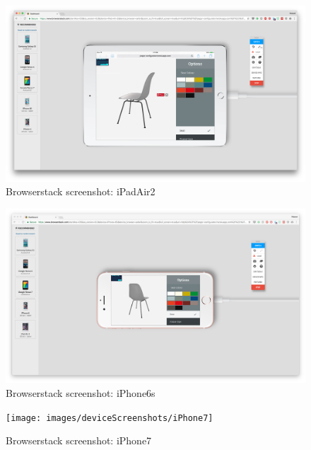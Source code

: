 \clearpage

\begin{figure}
\includegraphics[width=15cm]{images/deviceScreenshots/iPadAir2}
\caption{Browserstack screenshot: iPadAir2}
\label{attachment:iPadAir2}
\end{figure}

\begin{figure}
\includegraphics[width=15cm]{images/deviceScreenshots/iPhone6s}
\caption{Browserstack screenshot: iPhone6s}
\label{attachment:iPhone6s}
\end{figure}

\clearpage

\begin{figure}
\texttt{[image: images/deviceScreenshots/iPhone7]}
\caption{Browserstack screenshot: iPhone7}
\label{attachment:iPhone7}
\end{figure}

